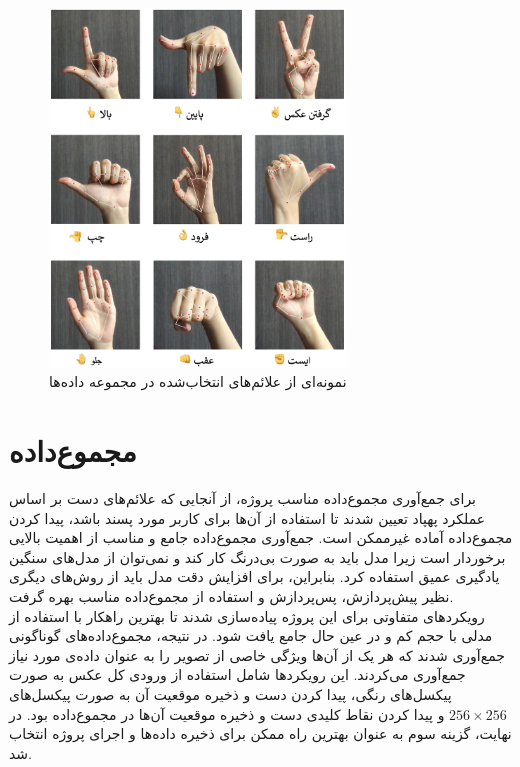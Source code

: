 \begin{figure}[h]
    \centering
    \includegraphics[width=0.7\textwidth]{gestures.png}
    \caption{نمونه‌ای از علائم‌های انتخاب‌شده در مجموعه داده‌ها}
    \label{t}
\end{figure}

\section[مجموع‌داده]{مجموع‌داده \protect{}}
برای جمع‌آوری مجموع‌داده مناسب پروژه، از آنجایی که علائم‌های دست بر اساس عملکرد پهپاد تعیین شدند تا استفاده از آن‌ها برای کاربر مورد پسند باشد، پیدا کردن مجموع‌داده آماده غیرممکن است. جمع‌آوری مجموع‌داده جامع و مناسب از اهمیت
 بالایی برخوردار است زیرا مدل باید به صورت بی‌درنگ کار کند و نمی‌توان از مدل‌های سنگین یادگیری عمیق استفاده کرد. بنابراین، برای افزایش دقت مدل باید از روش‌های دیگری نظیر پیش‌پردازش، پس‌پردازش و استفاده از مجموع‌داده مناسب بهره گرفت.
\\
رویکردهای متفاوتی برای این پروژه پیاده‌سازی شدند تا بهترین راهکار با استفاده از مدلی با حجم کم و در عین حال جامع یافت شود. در نتیجه، مجموع‌داده‌های گوناگونی جمع‌آوری شدند که هر یک از آن‌ها ویژگی خاصی از تصویر
 را به عنوان داده‌ی مورد نیاز جمع‌آوری می‌کردند. این رویکردها شامل استفاده از ورودی کل عکس به صورت پیکسل‌های رنگی، پیدا کردن دست و ذخیره موقعیت آن به صورت پیکسل‌های $256 \times 256$ و پیدا کردن نقاط کلیدی دست و ذخیره موقعیت آن‌ها در مجموع‌داده بود. در نهایت، گزینه سوم به عنوان بهترین راه ممکن برای ذخیره داده‌ها و اجرای پروژه انتخاب شد.

